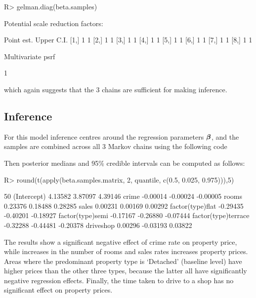 \documentclass[article,shortnames,nojss]{jss}
\newcommand{\bd}[1]{\ensuremath{\mbox{\boldmath $#1$}}}
\begin{document}
\begin{CodeInput}
R> gelman.diag(beta.samples)
\end{CodeInput}


\begin{CodeOutput}
Potential scale reduction factors:

     Point est. Upper C.I.
[1,]          1          1
[2,]          1          1
[3,]          1          1
[4,]          1          1
[5,]          1          1
[6,]          1          1
[7,]          1          1
[8,]          1          1

Multivariate psrf

1
\end{CodeOutput}

which again suggests that the 3 chains are sufficient for making inference. 


\subsection{Inference}
For this model inference centres around the regression parameters $\bd{\beta}$, and the samples are combined across all 3 Markov chains using the following code


Then posterior medians and 95\% credible intervals can be computed as follows:


\begin{CodeInput}
R> round(t(apply(beta.samples.matrix, 2, quantile, c(0.5, 0.025, 0.975))),5)
\end{CodeInput}


\begin{CodeOutput}
                         50%
(Intercept)          4.13582  3.87097  4.39146
crime               -0.00014 -0.00024 -0.00005
rooms                0.23376  0.18488  0.28285
sales                0.00231  0.00169  0.00292
factor(type)flat    -0.29435 -0.40201 -0.18927
factor(type)semi    -0.17167 -0.26880 -0.07444
factor(type)terrace -0.32288 -0.44481 -0.20378
driveshop            0.00296 -0.03193  0.03822
\end{CodeOutput}

The results show a significant negative effect of crime rate on property price, while increases in the number of rooms and sales rates increases property prices. Areas where the predominant property type is `Detached' (baseline level) have higher prices than the other three types, because the latter all have significantly negative regression effects. Finally, the time taken to drive to a shop has no significant effect on property prices. 
\end{document}
